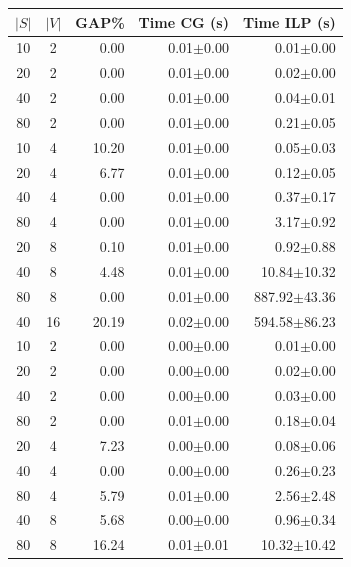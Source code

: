 \documentclass[english]{beamer}
\begin{document}
\begin{frame}
\begin{table}[h]
\begin{center}
\scriptsize
  \begin{tabular}{c c | r | r r}
  \hline
  $|S|$&$|V|$&    GAP\%   & Time CG (s)    & Time ILP (s)         \\
  \hline
  10 & 2    &   0.00      &  0.01$\pm$0.00 &  0.01$\pm$0.00       \\
  20 & 2    &   0.00      &  0.01$\pm$0.00 &  0.02$\pm$0.00       \\
  40 & 2    &   0.00      &  0.01$\pm$0.00 &  0.04$\pm$0.01       \\
  80 & 2    &   0.00      &  0.01$\pm$0.00 &  0.21$\pm$0.05       \\
  10 & 4    &   10.20     &  0.01$\pm$0.00 &  0.05$\pm$0.03       \\
  20 & 4    &   6.77      &  0.01$\pm$0.00 &  0.12$\pm$0.05       \\
  40 & 4    &  0.00       &  0.01$\pm$0.00 &  0.37$\pm$0.17       \\
  80 & 4    &   0.00      &  0.01$\pm$0.00 &  3.17$\pm$0.92       \\
  20 & 8    &   0.10      &  0.01$\pm$0.00 &  0.92$\pm$0.88       \\
  40 & 8    &   4.48      &  0.01$\pm$0.00 &  10.84$\pm$10.32     \\
  80 & 8    &   0.00      &  0.01$\pm$0.00 &  887.92$\pm$43.36    \\
  40 & 16   &   20.19     &  0.02$\pm$0.00 &  594.58$\pm$86.23    \\
  \hline                                                                                  
  10 & 2    &   0.00      &  0.00$\pm$0.00 &  0.01$\pm$0.00       \\
  20 & 2    &   0.00      &  0.00$\pm$0.00 &  0.02$\pm$0.00       \\
  40 & 2    &   0.00      &  0.00$\pm$0.00 &  0.03$\pm$0.00       \\
  80 & 2    &   0.00      &  0.01$\pm$0.00 &  0.18$\pm$0.04       \\
  20 & 4    &   7.23      &  0.00$\pm$0.00 &  0.08$\pm$0.06       \\
  40 & 4    &  0.00       &  0.00$\pm$0.00 &  0.26$\pm$0.23       \\
  80 & 4    &   5.79      &  0.01$\pm$0.00 &  2.56$\pm$2.48       \\
  40 & 8    &  5.68       &  0.00$\pm$0.00 &  0.96$\pm$0.34       \\
  80 & 8    &  16.24      &  0.01$\pm$0.01 &  10.32$\pm$10.42     \\
\end{tabular}
\end{center}
\end{table}
\end{frame}
\end{document}
